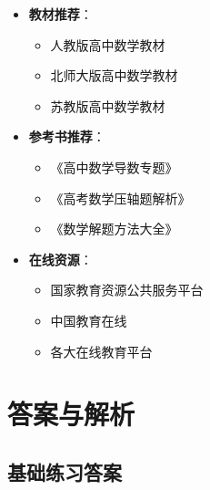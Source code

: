 \documentclass[a4paper,11pt]{ctexrep}
\theoremstyle{definition}
\begin{document}
\begin{itemize}
    \item \textbf{教材推荐}：
    \begin{itemize}
        \item 人教版高中数学教材
        \item 北师大版高中数学教材
        \item 苏教版高中数学教材
    \end{itemize}
    
    \item \textbf{参考书推荐}：
    \begin{itemize}
        \item 《高中数学导数专题》
        \item 《高考数学压轴题解析》
        \item 《数学解题方法大全》
    \end{itemize}
    
    \item \textbf{在线资源}：
    \begin{itemize}
        \item 国家教育资源公共服务平台
        \item 中国教育在线
        \item 各大在线教育平台
    \end{itemize}
\end{itemize}

\section{答案与解析}

\subsection{基础练习答案}
\end{document}

